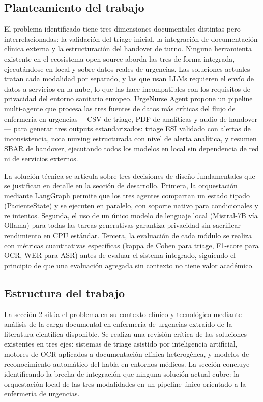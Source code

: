 \subsection{Planteamiento del trabajo}

El problema identificado tiene tres dimensiones documentales distintas pero interrelacionadas: la validación del triage inicial, la integración de documentación clínica externa y la estructuración del handover de turno. Ninguna herramienta existente en el ecosistema open source aborda las tres de forma integrada, ejecutándose en local y sobre datos reales de urgencias. Las soluciones actuales tratan cada modalidad por separado, y las que usan LLMs requieren el envío de datos a servicios en la nube, lo que las hace incompatibles con los requisitos de privacidad del entorno sanitario europeo.
UrgeNurse Agent propone un pipeline multi-agente que procesa las tres fuentes de datos más críticas del flujo de enfermería en urgencias —CSV de triage, PDF de analíticas y audio de handover— para generar tres outputs estandarizados: triage ESI validado con alertas de inconsistencia, nota nursing estructurada con nivel de alerta analítica, y resumen SBAR de handover, ejecutando todos los modelos en local sin dependencia de red ni de servicios externos.

La solución técnica se articula sobre tres decisiones de diseño fundamentales que se justifican en detalle en la sección de desarrollo. Primera, la orquestación mediante LangGraph permite que los tres agentes compartan un estado tipado (PacienteState) y se ejecuten en paralelo, con soporte nativo para condicionales y re intentos. Segunda, el uso de un único modelo de lenguaje local (Mistral-7B vía Ollama) para todas las tareas generativas garantiza privacidad sin sacrificar rendimiento en CPU estándar. Tercera, la evaluación de cada módulo se realiza con métricas cuantitativas específicas (kappa de Cohen para triage, F1-score para OCR, WER para ASR) antes de evaluar el sistema integrado, siguiendo el principio de que una evaluación agregada sin contexto no tiene valor académico.

\subsection{Estructura del trabajo}

La sección 2 sitúa el problema en su contexto clínico y tecnológico mediante análisis de la carga documental en enfermería de urgencias extraído de la literatura científica disponible. Se realiza una revisión crítica de las soluciones existentes en tres ejes: sistemas de triage asistido por inteligencia artificial, motores de OCR aplicados a documentación clínica heterogénea, y modelos de reconocimiento automático del habla en entornos médicos. La sección concluye identificando la brecha de integración que ninguna solución actual cubre: la orquestación local de las tres modalidades en un pipeline único orientado a la enfermería de urgencias.

